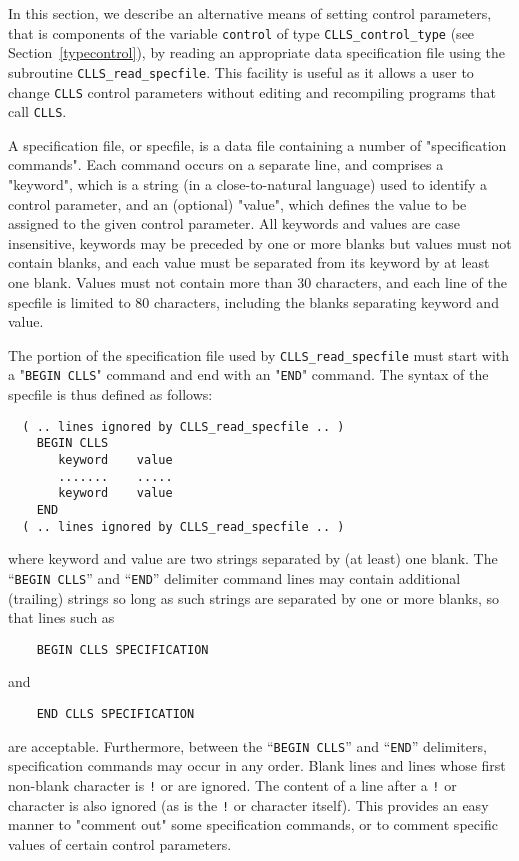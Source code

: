 \documentclass{galahad}
\newcommand{\packagename}{CLLS}
\begin{document}

\galfeatures
\noindent In this section, we describe an alternative means of setting
control parameters, that is components of the variable {\tt control} of type
{\tt \packagename\_control\_type}
(see Section~\ref{typecontrol}),
by reading an appropriate data specification file using the
subroutine {\tt \packagename\_read\_specfile}. This facility
is useful as it allows a user to change  {\tt \packagename} control parameters
without editing and recompiling programs that call {\tt \packagename}.

A specification file, or specfile, is a data file containing a number of
"specification commands". Each command occurs on a separate line,
and comprises a "keyword",
which is a string (in a close-to-natural language) used to identify a
control parameter, and
an (optional) "value", which defines the value to be assigned to the given
control parameter. All keywords and values are case insensitive,
keywords may be preceded by one or more blanks but
values must not contain blanks, and
each value must be separated from its keyword by at least one blank.
Values must not contain more than 30 characters, and
each line of the specfile is limited to 80 characters,
including the blanks separating keyword and value.



The portion of the specification file used by
{\tt \packagename\_read\_specfile}
must start
with a "{\tt BEGIN \packagename}" command and end with an
"{\tt END}" command.  The syntax of the specfile is thus defined as follows:
\begin{verbatim}
  ( .. lines ignored by CLLS_read_specfile .. )
    BEGIN CLLS
       keyword    value
       .......    .....
       keyword    value
    END
  ( .. lines ignored by CLLS_read_specfile .. )
\end{verbatim}
where keyword and value are two strings separated by (at least) one blank.
The ``{\tt BEGIN \packagename}'' and ``{\tt END}'' delimiter command lines
may contain additional (trailing) strings so long as such strings are
separated by one or more blanks, so that lines such as
\begin{verbatim}
    BEGIN CLLS SPECIFICATION
\end{verbatim}
and
\begin{verbatim}
    END CLLS SPECIFICATION
\end{verbatim}
are acceptable. Furthermore,
between the
``{\tt BEGIN \packagename}'' and ``{\tt END}'' delimiters,
specification commands may occur in any order.  Blank lines and
lines whose first non-blank character is {\tt !} or {\tt *} are ignored.
The content
of a line after a {\tt !} or {\tt *} character is also
ignored (as is the {\tt !} or {\tt *}
character itself). This provides an easy manner to "comment out" some
specification commands, or to comment specific values
of certain control parameters.
\end{document}
